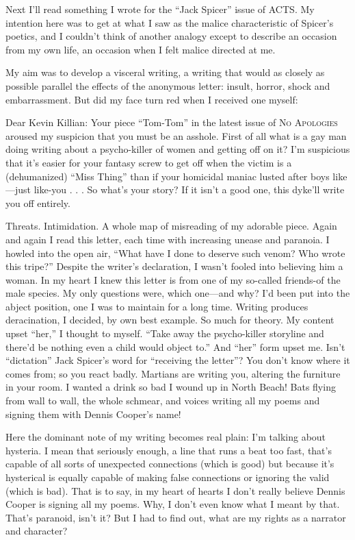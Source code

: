\documentclass[
]{memoir}
\begin{document}
Next I'll read something I wrote for the ``Jack Spicer'' issue of
\textsc{ACTS}. My intention here was to get at what I saw as the malice
characteristic of Spicer's poetics, and I couldn't think of another
analogy except to describe an occasion from my own life, an occasion
when I felt malice directed at me.

My aim was to develop a visceral writing, a writing that would as
closely as possible parallel the effects of the anonymous letter:
insult, horror, shock and embarrassment. But did my face turn red when I
received one myself:

Dear Kevin Killian: Your piece ``Tom-Tom'' in the latest issue of
\textsc{No Apologies} aroused my suspicion that you must be an asshole.
First of all what is a gay man doing writing about a psycho-killer of
women and getting off on it? I'm suspicious that it's easier for your
fantasy screw to get off when the victim is a (dehumanized) ``Miss
Thing'' than if your homicidal maniac lusted after boys like---just
like-you . . . So what's your story? If it isn't a good one, this
dyke'll write you off entirely.

Threats. Intimidation. A whole map of misreading of my adorable piece.
Again and again I read this letter, each time with increasing unease and
paranoia. I howled into the open air, ``What have I done to deserve such
venom? Who wrote this tripe?'' Despite the writer's declaration, I
wasn't fooled into believing him a woman. In my heart I knew this letter
is from one of my so-called friends-of the male species. My only
questions were, which one---and why? I'd been put into the abject
position, one I was to maintain for a long time. Writing produces
deracination, I decided, by own best example. So much for theory. My
content upset ``her,'' I thought to myself. ``Take away the
psycho-killer storyline and there'd be nothing even a child would object
to.'' And ``her'' form upset me. Isn't ``dictation'' Jack Spicer's word
for ``receiving the letter''? You don't know where it comes from; so you
react badly. Martians are writing you, altering the furniture in your
room. I wanted a drink so bad I wound up in North Beach! Bats flying
from wall to wall, the whole schmear, and voices writing all my poems
and signing them with Dennis Cooper's name!

Here the dominant note of my writing becomes real plain: I'm talking
about hysteria. I mean that seriously enough, a line that runs a beat
too fast, that's capable of all sorts of unexpected connections (which
is good) but because it's hysterical is equally capable of making false
connections or ignoring the valid (which is bad). That is to say, in my
heart of hearts I don't really believe Dennis Cooper is signing all my
poems. Why, I don't even know what I meant by that. That's paranoid,
isn't it? But I had to find out, what are my rights as a narrator and
character?
\end{document}
